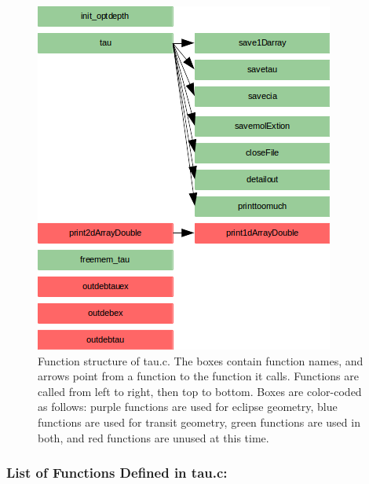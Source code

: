 \documentclass[letterpaper,12pt]{article}
\begin{document}
\begin{figure}
\includegraphics{fig/tauc}
\caption{Function structure of tau.c. The boxes contain function names, and arrows point from a function to the function it calls. Functions are called from left to right, then top to bottom.  Boxes are color-coded as follows:  purple functions are used for eclipse geometry, blue functions are used for transit geometry, green functions are used in both, and red functions are unused at this time.}
\label{fig:tauc}
\end{figure}

\subsubsection{List of Functions Defined in tau.c:}

 \newline

 \newline

 \newline
\end{document}
